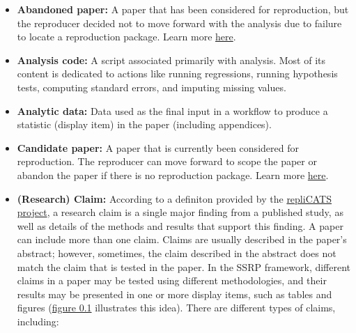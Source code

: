 \documentclass[
  openany]{book}
\begin{document}
\begin{itemize}
\item
  \textbf{Abandoned paper:} A paper that has been considered for reproduction, but the reproducer decided not to move forward with the analysis due to failure to locate a reproduction package. Learn more \href{https://bitss.github.io/ACRE/scoping.html\#from-candidate-to-declared-paper}{here}.
\item
  \textbf{Analysis code:} A script associated primarily with analysis. Most of its content is dedicated to actions like running regressions, running hypothesis tests, computing standard errors, and imputing missing values.
\item
  \textbf{Analytic data:} Data used as the final input in a workflow to produce a statistic (display item) in the paper (including appendices).
\item
  \textbf{Candidate paper:} A paper that is currently been considered for reproduction. The reproducer can move forward to scope the paper or abandon the paper if there is no reproduction package. Learn more \href{https://bitss.github.io/ACRE/scoping.html\#from-candidate-to-declared-paper}{here}.
\item
  \textbf{(Research) Claim:} According to a definiton provided by the \href{https://replicats.research.unimelb.edu.au/\#tab301}{repliCATS project}, a research claim is a single major finding from a published study, as well as details of the methods and results that support this finding. A paper can include more than one claim. Claims are usually described in the paper's abstract; however, sometimes, the claim described in the abstract does not match the claim that is tested in the paper.
  In the SSRP framework, different claims in a paper may be tested using different methodologies, and their results may be presented in one or more display items, such as tables and figures (\href{https://bitss.github.io/ACRE/intro.html\#fig:diagram}{figure 0.1} illustrates this idea). There are different types of claims, including:


\end{itemize}
\end{document}

